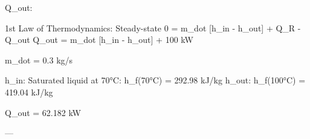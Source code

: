 Q_out:  

1st Law of Thermodynamics: Steady-state  
0 = m_dot [h_in - h_out] + Q_R - Q_out  
Q_out = m_dot [h_in - h_out] + 100 kW  

m_dot = 0.3 kg/s  

h_in: Saturated liquid at 70°C: h_f(70°C) = 292.98 kJ/kg  
h_out: h_f(100°C) = 419.04 kJ/kg  

Q_out = 62.182 kW  

---